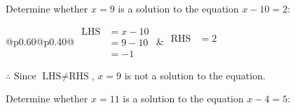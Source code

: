 \documentclass[12pt]{article}
\newcounter{minipagecount}
\begin{document}
\begin{multicols}{2}
\begin{minipage}[t]{0.40\textwidth}
    \noindent Determine whether \(x = 9\) is a solution to the equation \(x - 10 = 2\):
    \vspace{4pt}  %

    \noindent
    \renewcommand{\arraystretch}{1.3} %
    \begin{tabular}{@{}p{0.60\linewidth}@{}p{0.40\linewidth}@{}}
        \(\begin{aligned}
            \text{LHS} &= x - 10 \\
                    &= 9 - 10 \\
                    &= -1
        \end{aligned}\) &
        \(\begin{aligned}
            \text{RHS} &= 2\\
                    & \\
                    &
        \end{aligned}\)
    \end{tabular}
    \renewcommand{\arraystretch}{1.0} %
    \vspace{2pt}  %

    \noindent \(\therefore\) Since \(\text{LHS} \neq \text{RHS}\), \(x = 9\) is not  a solution to the equation.

\end{minipage}

 \vspace*{16pt}
\noindent{(\theminipagecount)}\hspace{0.1mm} %
\begin{minipage}[t]{0.40\textwidth} %

    \noindent Determine whether \(x = 11\) is a solution to the equation \(x - 4 = 5\):
    \vspace{4pt}  %


\end{minipage}
\end{multicols}
\end{document}
